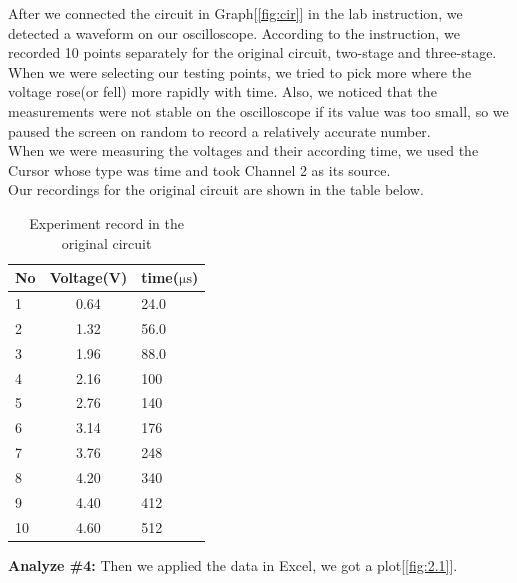 \hfill \newline
\phantom{ } After we connected the circuit in Graph[\ref{fig:cir}] in the lab instruction, we detected a waveform on our oscilloscope. According to the instruction, we recorded 10 points separately for the original circuit, two-stage and three-stage. When we were selecting our testing points, we tried to pick more where the voltage rose(or fell) more rapidly with time. Also, we noticed that the measurements were not stable on the oscilloscope if its value was too small, so we paused the screen on random to record a relatively accurate number.\\
\phantom{ } When we were measuring the voltages and their according time, we used the Cursor whose type was time and took Channel 2 as its source.\\
\phantom{ } Our recordings for the original circuit are shown in the table below.

\begin{table}[!htbp]\centering
	\caption{Experiment record in the original circuit}
	\renewcommand\arraystretch{1.5}
	\begin{tabular}{lcl}
		\toprule
		No		&Voltage(V)	&time($\mathrm{\mu s}$)	\\
		\midrule
		1		&0.64		&24.0		\\
		
		2		&1.32		&56.0		\\
		
		3		&1.96		&88.0		\\
		
		4		&2.16		&100		\\
		
		5		&2.76		&140		\\
		
		6		&3.14		&176		\\
		
		7		&3.76		&248		\\
		
		8		&4.20		&340		\\
		
		9		&4.40		&412		\\
		
		10		&4.60		&512		\\
		\bottomrule
	\end{tabular}
\end{table}
\hfill \newline
\textbf{Analyze \#4:} \newline
\phantom{ } Then we applied the data in Excel, we got a plot[\ref{fig:2.1}].\\

